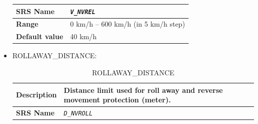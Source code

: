 \documentclass{template/openetcs}
\begin{document}
\begin{itemize}
\begin{longtable}{|l|l|}
				\hline
				
					\begin{minipage}[t]{0.22\linewidth} \textbf{SRS Name}	\end{minipage} 
				&	\begin{minipage}[t]{0.78\linewidth} \emph{\texttt{V\_NVREL}} \end{minipage} \\
				
				\hline
														
					\begin{minipage}[t]{0.22\linewidth} \textbf{Range}	\end{minipage} 
				&	\begin{minipage}[t]{0.78\linewidth} 0 km/h – 600 km/h (in 5 km/h step) \end{minipage} \\
				
				\hline
										
					\begin{minipage}[t]{0.22\linewidth} \textbf{Default value}	\end{minipage} 
				&	\begin{minipage}[t]{0.78\linewidth} 40 km/h \end{minipage} \\
				
				\hline
				
			\end{longtable}						
			
		\item ROLLAWAY\_DISTANCE:
		
			\begin{longtable}{|l|l|}
				\caption{ROLLAWAY\_DISTANCE}\\ 														
				\hline
				
					\begin{minipage}[t]{0.22\linewidth} \textbf{Description}	\end{minipage} 
				&	\begin{minipage}[t]{0.78\linewidth} Distance limit used for roll away and reverse movement protection (meter). \end{minipage} \\
				
				\hline
				
					\begin{minipage}[t]{0.22\linewidth} \textbf{SRS Name}	\end{minipage} 
				&	\begin{minipage}[t]{0.78\linewidth} \emph{\texttt{D\_NVROLL}} \end{minipage} \\
				

\end{longtable}
\end{itemize}
\end{document}
